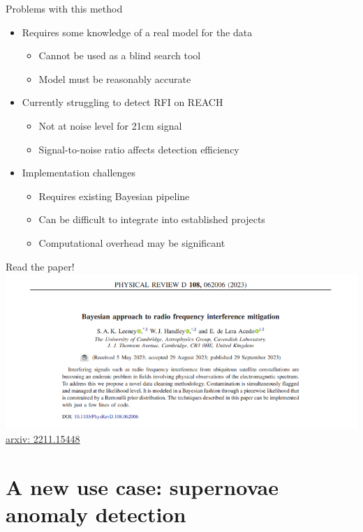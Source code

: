 \documentclass[aspectratio=169]{beamer}
\begin{document}
\begin{frame}{Problems with this method}
    \begin{itemize}
        \item Requires some knowledge of a real model for the data
        \begin{itemize}
            \item Cannot be used as a blind search tool
            \item Model must be reasonably accurate
        \end{itemize}
        \item Currently struggling to detect RFI on REACH
        \begin{itemize}
            \item Not at noise level for 21cm signal
            \item Signal-to-noise ratio affects detection efficiency
        \end{itemize}
        \item Implementation challenges
        \begin{itemize}
            \item Requires existing Bayesian pipeline
            \item Can be difficult to integrate into established projects
            \item Computational overhead may be significant
        \end{itemize}
    \end{itemize}
\end{frame}

\begin{frame}{Read the paper!}
  \includegraphics[width=1\textwidth]{images/paper1.png}
  \href{https://arxiv.org/abs/2211.15448}{arxiv: 2211.15448}
\end{frame}

\section{A new use case: supernovae anomaly detection}
\end{document}
